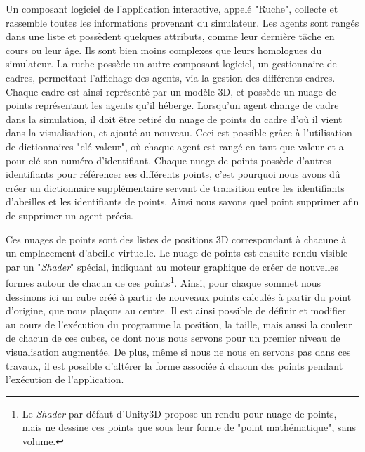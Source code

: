 	
		Un composant logiciel de l'application interactive, appelé "Ruche", collecte et rassemble toutes les informations provenant du simulateur. Les agents sont rangés dans une liste et possèdent quelques attributs, comme leur dernière tâche en cours ou leur âge. Ils sont bien moins complexes que leurs homologues du simulateur. La ruche possède un autre composant logiciel, un gestionnaire de cadres, permettant l'affichage des agents, via la gestion des différents cadres. Chaque cadre est ainsi représenté par un modèle 3D, et possède un nuage de points représentant les agents qu'il héberge. Lorsqu'un agent change de cadre dans la simulation, il doit être retiré du nuage de points du cadre d'où il vient dans la visualisation, et ajouté au nouveau. Ceci est possible grâce à l'utilisation de dictionnaires "clé-valeur", où chaque agent est rangé en tant que valeur et a pour clé son numéro d'identifiant. 
		Chaque nuage de points possède d'autres identifiants pour référencer ses différents points, c'est pourquoi nous avons dû créer un dictionnaire supplémentaire servant de transition entre les identifiants d'abeilles et les identifiants de points. Ainsi nous savons quel point supprimer afin de supprimer un agent précis.
		
		Ces nuages de points sont des listes de positions 3D correspondant à chacune à un emplacement d'abeille virtuelle. Le nuage de points est ensuite rendu visible par un "\textit{Shader}" spécial, indiquant au moteur graphique de créer de nouvelles formes autour de chacun de ces points\footnote{Le \textit{Shader} par défaut d'Unity3D propose un rendu pour nuage de points, mais ne dessine ces points que sous leur forme de "point mathématique", sans volume.}. Ainsi, pour chaque sommet nous dessinons ici un cube créé à partir de nouveaux points calculés à partir du point d'origine, que nous plaçons au centre. Il est ainsi possible de définir et modifier au cours de l'exécution du programme la position, la taille, mais aussi la couleur de chacun de ces cubes, ce dont nous nous servons pour un premier niveau de visualisation augmentée. De plus, même si nous ne nous en servons pas dans ces travaux, il est possible d'altérer la forme associée à chacun des points pendant l'exécution de l'application.
		
